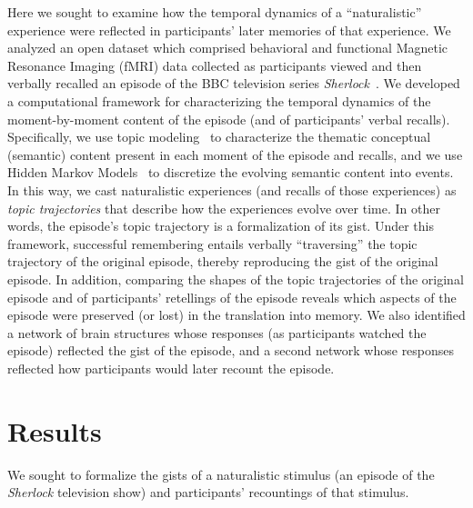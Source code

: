 \documentclass{article}
\begin{document}
Here we sought to examine how the temporal dynamics of a ``naturalistic'' experience were reflected in participants' later memories of that experience.  We analyzed an open dataset which comprised behavioral and functional Magnetic Resonance Imaging (fMRI) data collected as participants viewed and then verbally recalled an episode of the BBC television series \textit{Sherlock}~\citep{ChenEtal17}.  We developed a computational framework for characterizing the temporal dynamics of the moment-by-moment content of the episode (and of participants' verbal recalls).  Specifically, we use topic modeling~\citep{BleiEtal03} to characterize the thematic conceptual (semantic) content present in each moment of the episode and recalls, and we use Hidden Markov Models~\citep{Rabi89, BaldEtal17} to discretize the evolving semantic content into events.  In this way, we cast naturalistic experiences (and recalls of those experiences) as \textit{topic trajectories} that describe how the experiences evolve over time.  In other words, the episode's topic trajectory is a formalization of its gist.  Under this framework, successful remembering entails verbally ``traversing'' the topic trajectory of the original episode, thereby reproducing the gist of the original episode.  In addition, comparing the shapes of the topic trajectories of the original episode and of participants' retellings of the episode reveals which aspects of the episode were preserved (or lost) in the translation into memory.  We also identified a network of brain structures whose responses (as participants watched the episode) reflected the gist of the episode, and a second network whose responses reflected how participants would later recount the episode.


\section*{Results}


We sought to formalize the gists of a naturalistic stimulus (an episode of the \textit{Sherlock} television show) and participants' recountings of that stimulus.
\end{document}

